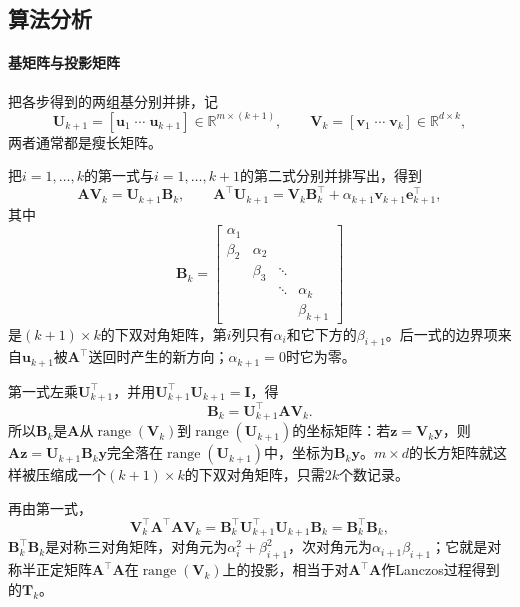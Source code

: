 \subsection{算法分析}

\paragraph{基矩阵与投影矩阵}
把各步得到的两组基分别并排，记
\begin{equation}
 \bm U_{k+1}=[\bm u_1\;\cdots\;\bm u_{k+1}]\in\mathbb R^{m\times(k+1)},\qquad
 \bm V_k=[\bm v_1\;\cdots\;\bm v_k]\in\mathbb R^{d\times k},
 \label{eq:ls-golub-kahan-bases}
\end{equation}
两者通常都是瘦长矩阵。

把$i=1,\ldots,k$的第一式与$i=1,\ldots,k+1$的第二式分别并排写出，得到
\begin{equation}
 \bm A\bm V_k=\bm U_{k+1}\bm B_k,\qquad
 \bm A^\top\bm U_{k+1}=\bm V_k\bm B_k^\top+\alpha_{k+1}\bm v_{k+1}\bm e_{k+1}^\top ,
 \label{eq:ls-golub-kahan-relations}
\end{equation}
其中
\begin{equation}
 \bm B_k=
 \begin{bmatrix}
 \alpha_1&&&\\
 \beta_2&\alpha_2&&\\
 &\beta_3&\ddots&\\
 &&\ddots&\alpha_k\\
 &&&\beta_{k+1}
 \end{bmatrix}
 \label{eq:ls-golub-kahan-bidiagonal-matrix}
\end{equation}
是$(k+1)\times k$的下双对角矩阵，第$i$列只有$\alpha_i$和它下方的$\beta_{i+1}$。后一式的边界项来自$\bm u_{k+1}$被$\bm A^\top$送回时产生的新方向；$\alpha_{k+1}=0$时它为零。

第一式左乘$\bm U_{k+1}^\top$，并用$\bm U_{k+1}^\top\bm U_{k+1}=\bm I$，得
\begin{equation}
 \bm B_k=\bm U_{k+1}^\top\bm A\bm V_k .
 \label{eq:ls-golub-kahan-projection}
\end{equation}
所以$\bm B_k$是$\bm A$从$\operatorname{range}(\bm V_k)$到$\operatorname{range}(\bm U_{k+1})$的坐标矩阵：若$\bm z=\bm V_k\bm y$，则$\bm A\bm z=\bm U_{k+1}\bm B_k\bm y$完全落在$\operatorname{range}(\bm U_{k+1})$中，坐标为$\bm B_k\bm y$。$m\times d$的长方矩阵就这样被压缩成一个$(k+1)\times k$的下双对角矩阵，只需$2k$个数记录。

再由第一式，
\begin{equation}
 \bm V_k^\top\bm A^\top\bm A\bm V_k=\bm B_k^\top\bm U_{k+1}^\top\bm U_{k+1}\bm B_k=\bm B_k^\top\bm B_k ,
 \label{eq:ls-golub-kahan-normal-projection}
\end{equation}
$\bm B_k^\top\bm B_k$是对称三对角矩阵，对角元为$\alpha_i^2+\beta_{i+1}^2$，次对角元为$\alpha_{i+1}\beta_{i+1}$；它就是对称半正定矩阵$\bm A^\top\bm A$在$\operatorname{range}(\bm V_k)$上的投影，相当于对$\bm A^\top\bm A$作Lanczos过程得到的$\bm T_k$。

